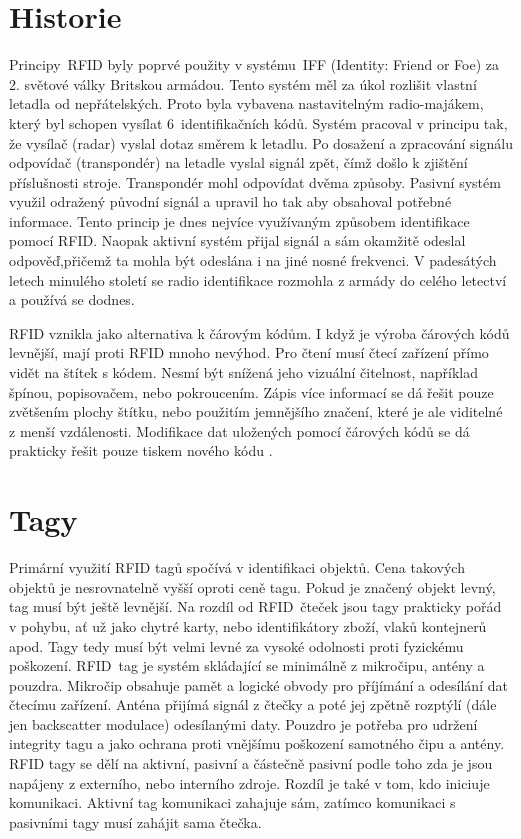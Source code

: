 \section{Historie}
Principy~RFID byly poprvé použity v systému~IFF (Identity: Friend or Foe) za 2. světové války Britskou armádou. Tento systém měl za úkol rozlišit vlastní letadla od nepřátelských. Proto byla vybavena nastavitelným {radio-majákem}, který byl schopen vysílat 6~identifikačních kódů. Systém pracoval v principu tak, že vysílač (radar) vyslal dotaz směrem k letadlu. Po dosažení a zpracování signálu odpovídač (transpondér) na letadle vyslal signál zpět, čímž došlo k zjištění příslušnosti stroje. Transpondér mohl odpovídat dvěma způsoby. Pasivní systém využil odražený původní signál a upravil ho tak aby obsahoval potřebné informace. Tento princip je dnes nejvíce využívaným způsobem identifikace pomocí RFID. Naopak aktivní systém přijal signál a sám okamžitě odeslal odpověď,přičemž ta mohla být odeslána i na jiné nosné frekvenci. V padesátých letech minulého století se radio identifikace rozmohla z armády do celého letectví a používá se dodnes. %
\par
RFID vznikla jako alternativa k čárovým kódům. I když je výroba čárových kódů levnější, mají proti RFID mnoho nevýhod. Pro čtení musí čtecí zařízení přímo vidět na štítek s kódem. Nesmí být snížená jeho vizuální čitelnost, například špínou, popisovačem, nebo pokroucením. Zápis více informací se dá řešit pouze zvětšením plochy štítku, nebo použitím jemnějšího značení, které je ale viditelné z menší vzdálenosti. Modifikace dat uložených pomocí čárových kódů se dá prakticky řešit pouze tiskem nového kódu \cite{The_RF_in_RFID}\cite{Emulator_UHD_RFID_Tagu}.

\section{Tagy}
Primární využití RFID tagů spočívá v identifikaci objektů. Cena takových objektů je nesrovnatelně vyšší oproti ceně tagu. Pokud je značený objekt levný, tag musí být ještě levnější. Na rozdíl od RFID~čteček jsou tagy prakticky pořád v pohybu, ať už jako chytré karty, nebo identifikátory zboží, vlaků kontejnerů apod. Tagy tedy musí být velmi levné za vysoké odolnosti proti fyzickému poškození\cite{The_RF_in_RFID}.
RFID~tag je systém skládající se minimálně z mikročipu, antény a pouzdra. Mikročip obsahuje pamět a logické obvody pro příjímání a odesílání dat čtecímu zařízení. Anténa přijímá signál z čtečky a poté jej zpětně rozptýlí (dále jen backscatter modulace) odesílanými daty. Pouzdro je potřeba pro udržení integrity tagu a jako ochrana proti vnějšímu poškození samotného čipu a antény\cite{RFID_explained}.
RFID tagy se dělí na aktivní, pasivní a částečně pasivní podle toho zda je jsou napájeny z externího, nebo interního zdroje\cite{The_RF_in_RFID}. Rozdíl je také v tom, kdo iniciuje komunikaci. Aktivní tag komunikaci zahajuje sám, zatímco komunikaci s pasivními tagy musí zahájit sama čtečka\cite{Hazardous_areas}. 

